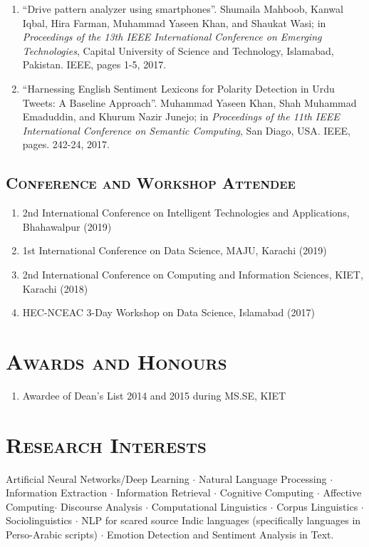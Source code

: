 \documentclass[a4paper, 10pt]{article}
\begin{document}
\begin{enumerate}
  \item ``Drive pattern analyzer using smartphones''. Shumaila Mahboob, Kanwal Iqbal, Hira Farman, Muhammad Yaseen Khan, and Shaukat Wasi; in \emph{ Proceedings of the 13th IEEE International Conference on Emerging Technologies}, Capital University of Science and Technology, Islamabad, Pakistan. IEEE, pages 1-5, 2017.
  
  \item ``Harnessing English Sentiment Lexicons for Polarity Detection in Urdu Tweets: A Baseline Approach''. Muhammad Yaseen Khan, Shah Muhammad Emaduddin, and Khurum Nazir Junejo;  in \emph{Proceedings of the 11th IEEE International Conference on Semantic Computing}, San Diago, USA. IEEE, pages. 242-24, 2017.
\end{enumerate}

\subsection*{\normalfont\textsc{Conference and Workshop Attendee}}
\begin{enumerate}
\itemsep-4pt
\item 2nd International Conference on Intelligent Technologies and Applications, Bhahawalpur (2019)
\item 1st International Conference on Data Science, MAJU, Karachi (2019)
\item 2nd International Conference on Computing and Information Sciences, KIET, Karachi (2018)
\item HEC-NCEAC 3-Day Workshop on Data Science, Islamabad (2017) 
\end{enumerate}

\section*{\normalfont\textsc{Awards and Honours}}
\begin{enumerate}
\itemsep-4pt 
 \item Awardee of Dean's List 2014 and 2015 during MS.SE, KIET
\end{enumerate}

\section*{\normalfont\textsc{Research Interests}}
Artificial Neural Networks/Deep Learning $\cdot$ Natural Language Processing $\cdot$ Information Extraction $\cdot$ Information Retrieval $\cdot$ Cognitive Computing $\cdot$ Affective Computing$\cdot$ Discourse Analysis $\cdot$ Computational Linguistics $\cdot$  Corpus Linguistics $\cdot$ Sociolinguistics $\cdot$ NLP for scared source Indic languages (specifically languages in Perso-Arabic scripts) $\cdot$ Emotion Detection and Sentiment Analysis in Text.
\end{document}
